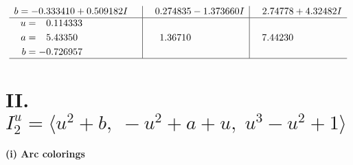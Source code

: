\documentclass[1p]{elsarticle_modified}
\theoremstyle{definition}
\begin{document}
$$\begin{array}{c|c|c}
\begin{aligned}
b &= -0.333410 + 0.509182 I\end{aligned}
 & \phantom{-}0.274835 - 1.373660 I & \phantom{-}2.74778 + 4.32482 I \\ \hline\begin{aligned}
u &= \phantom{-}0.114333\phantom{ +0.000000I} \\
a &= \phantom{-}5.43350\phantom{ +0.000000I} \\
b &= -0.726957\phantom{ +0.000000I}\end{aligned}
 & \phantom{-}1.36710\phantom{ +0.000000I} & \phantom{-}7.44230\phantom{ +0.000000I}\\
 \hline 
 \end{array}$$\newpage\newpage\renewcommand{\arraystretch}{1}
\centering \section*{II. $I^u_{2}= \langle u^2+b,\;- u^2+a+u,\;u^3- u^2+1 \rangle$}
\flushleft \textbf{(i) Arc colorings}\\
\end{document}
